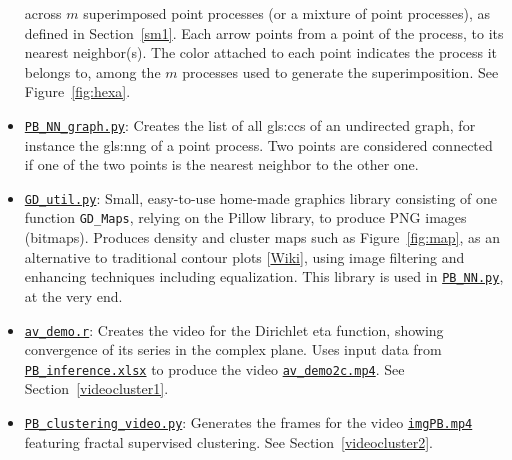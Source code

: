 \documentclass[10pt]{article}
\begin{document}
\begin{itemize}
     across $m$ superimposed point processes (or a mixture of point processes), as defined in Section~\ref{sm1}. Each arrow points from a point of the process, to its nearest neighbor(s).
    The color attached to each point indicates the process it belongs to, among the $m$ processes used to generate the superimposition. See
    Figure~\ref{fig:hexa}.
\item \href{https://github.com/VincentGranville/Point-Processes/blob/main/Source\%20Code/PB_NN_graph.py}{\texttt{PB\_NN\_graph.py}}: Creates the list of all
\glspl{gls:cc} of an
\textcolor{index}{undirected graph},
for instance the  \gls{gls:nng}
 of a point process. Two points are considered connected if one of the two points is the nearest neighbor to the other one.
\item \href{https://github.com/VincentGranville/Point-Processes/blob/main/Source\%20Code/PB_NN_graph.py}{\texttt{GD\_util.py}}: Small, easy-to-use home-made graphics library
consisting of one function \texttt{GD\_Maps}, relying on the Pillow library, to produce PNG images (bitmaps). Produces
density and cluster maps such as Figure~\ref{fig:map}, as an alternative to traditional contour plots [\href{https://scipython.com/book/chapter-7-matplotlib/examples/a-simple-contour-plot/}{Wiki}], using image filtering and enhancing techniques including
equalization. This library is used in
 \href{https://github.com/VincentGranville/Point-Processes/blob/main/Source\%20Code/PB_NN.py}{\texttt{PB\_NN.py}}, at the very end.

\item \href{https://github.com/VincentGranville/Point-Processes/blob/main/Videos/av_demo.r}{\texttt{av\_demo.r}}: Creates the video for the
\textcolor{index}{Dirichlet eta function}, showing
convergence of its series in the complex plane. Uses input data from
\href{https://github.com/VincentGranville/Point-Processes/tree/main/Spreadsheets}{\texttt{PB\_inference.xlsx}} to produce the video
\href{https://www.youtube.com/watch?v=FUxAeW4JEXA}{\texttt{av\_demo2c.mp4}}. See Section~\ref{videocluster1}.

\item \href{https://github.com/VincentGranville/Point-Processes/blob/main/Videos/PB_clustering_video.py}{\texttt{PB\_clustering\_video.py}}: Generates the frames for
the video  \href{https://www.youtube.com/watch?v=dNPSEh-X6uw}{\texttt{imgPB.mp4}} featuring \textcolor{index}{fractal supervised clustering}. See Section~\ref{videocluster2}.

\end{itemize}
\end{document}

